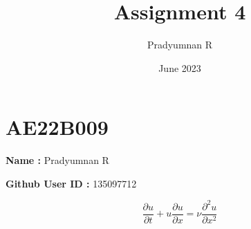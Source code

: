 \documentclass{article}
\title{Assignment 4}
\author{Pradyumnan R}
\date{June 2023}
\begin{document}
\maketitle

\section{AE22B009}

\textbf{Name :} Pradyumnan R

\bigskip

\noindent\textbf{Github User ID :} 135097712

\begin{equation}\label{1D}
    \frac{\partial u}{\partial t} + u\frac{\partial u}{\partial x} = \nu \frac{\partial^2 u}{\partial x^2}
\end{equation}

\bigskip
\end{document}
